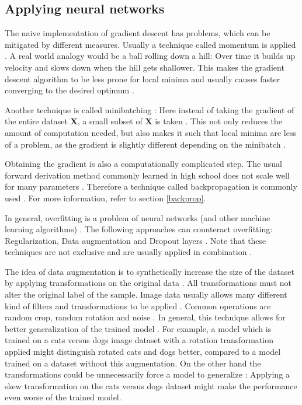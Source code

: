 \documentclass[draft,final,oneside]{vutinfth} %
\begin{document}
\subsection{Applying neural networks}

The naive implementation of gradient descent has problems, which can be mitigated by different measures. Usually a technique called momentum is applied \cite{Goodfellow-et-al-2016}. A real world analogy would be a ball rolling down a hill: Over time it builds up velocity and slows down when the hill gets shallower. This makes the gradient descent algorithm to be less prone for local minima and usually causes faster converging to the desired optimum \cite{Goodfellow-et-al-2016}.

Another technique is called minibatching \cite{Goodfellow-et-al-2016}: Here instead of taking the gradient of the entire dataset $\boldsymbol{X}$, a small subset of $\boldsymbol{X}$ is taken \cite{Goodfellow-et-al-2016}. This not only reduces the amount of computation needed, but also makes it such that local minima are less of a problem, as the gradient is slightly different depending on the minibatch \cite{Goodfellow-et-al-2016}.

Obtaining the gradient is also a computationally complicated step. The usual forward derivation method commonly learned in high school does not scale well for many parameters \cite{colahbackprop}. Therefore a technique called backpropagation is commonly used \cite{colahbackprop}. For more information, refer to section \ref{backprop}.

In general, overfitting is a problem of neural networks (and other machine learning algorithms) \cite{aimodern}. The following approaches can counteract overfitting: Regularization, Data augmentation and Dropout layers \cite{Goodfellow-et-al-2016}. Note that these techniques are not exclusive and are usually applied in combination \cite{Goodfellow-et-al-2016}.

The idea of data augmentation is to synthetically increase the size of the dataset by applying transformations on the original data \cite{dataaugmentation}. All transformations must not alter the original label of the sample. Image data usually allows many different kind of filters and transformations to be applied \cite{dataaugmentation}. Common operations are random crop, random rotation and noise \cite{dataaugmentation}. In general, this technique allows for better generalization of the trained model \cite{dataaugmentation}. For example, a model which is trained on a cats versus dogs image dataset with a rotation transformation applied might distinguish rotated cats and dogs better, compared to a model trained on a dataset without this augmentation. On the other hand the transformations could be unnecessarily force a model to generalize \cite{dataaugmentation}: Applying a skew transformation on the cats versus dogs dataset might make the performance even worse of the trained model.
\end{document}
